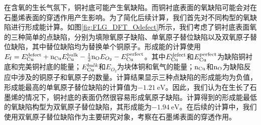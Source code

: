 在含氧的生长气氛下，铜衬底可能产生氧缺陷。而铜衬底表面的氧缺陷可能会对在石墨烯表面的穿透作用产生影响。为了简化后续计算，我们首先对不同构型的氧缺陷进行形成能计算。如图\ref{fig:FLG_DFT_Odefect}所示，我们考虑了铜衬底表面氧的三种简单的点缺陷，分别为\chinesecolon 填隙氧原子缺陷、单氧原子替位缺陷以及双氧原子替位缺陷，其中替位缺陷均为替换单个铜原子。形成能的计算使用$E_{\rm f}=E_{\rm Cu}^{\rm defect}+{\rm n_{Cu}}E_{\rm Cu}^{\rm bulk}-\frac{1}{2}{\rm n_{O}}E_{O_{2}} - E_{\rm Cu}^{\rm perfect}$。其中$E_{\rm Cu}^{\rm defect}$和$E_{\rm Cu}^{\rm perfect}$为缺陷铜衬底和完美铜衬底的能量；$E_{\rm Cu}^{bulk}$和$E_{O_{2}}$为块体铜和氧气的能量；${\rm n_{Cu}}$和${\rm n_{O}}$为缺陷反应中涉及的铜原子和氧原子的数量。计算结果显示三种点缺陷的形成能均为负值，形成能最高的单氧原子替位缺陷的计算值为$\SI{-1.21}{\electronvolt}$。因此，我们认为在生长了石墨烯的情况下，铜衬底的表面仍然很容易形成氧原子缺陷。计算得到的形成能最低的氧缺陷构型为双氧原子替位缺陷，其形成能为$\SI{-1.94}{\electronvolt}$。在后续的计算中，我们使用双氧原子替位缺陷作为主要研究对象，考察在石墨烯表面的穿透作用。

